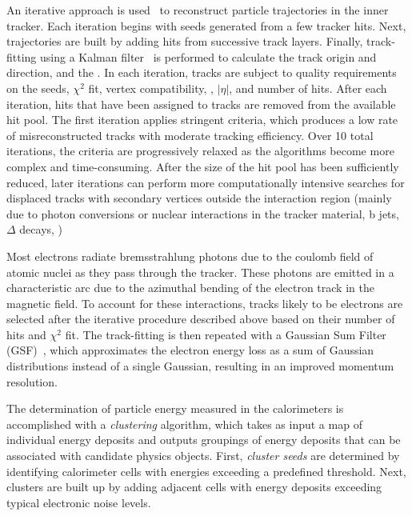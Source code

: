 An iterative approach is used~\cite{Chatrchyan:2014fea} to reconstruct particle
trajectories in the inner tracker. Each iteration begins with seeds generated
from a few tracker hits. Next, trajectories are built by adding hits from
successive track layers. Finally, track-fitting using a Kalman
filter~\cite{Fruhwirth:1987fm} is performed to calculate the track origin and
direction, and the \pT. In each iteration, tracks are subject to quality
requirements on the seeds, $\chi^2$ fit, vertex compatibility, \pT, $|\eta|$,
and number of hits. After each iteration, hits that have been assigned to tracks
are removed from the available hit pool. The first iteration applies stringent
criteria, which produces a low rate of misreconstructed tracks with moderate
tracking efficiency. Over 10 total iterations, the criteria are progressively
relaxed as the algorithms become more complex and time-consuming. After the size
of the hit pool has been sufficiently reduced, later iterations can perform more
computationally intensive searches for displaced tracks with secondary vertices
outside the interaction region (mainly due to photon conversions or nuclear
interactions in the tracker material, b jets, $\Delta$ decays, \etc)

Most electrons radiate bremsstrahlung photons due to the coulomb field of atomic
nuclei as they pass through the tracker. These photons are emitted in a
characteristic arc due to the azimuthal bending of the electron track in the
magnetic field. To account for these interactions, tracks likely to be electrons
are selected after the iterative procedure described above based on their number
of hits and $\chi^2$ fit. The track-fitting is then repeated with a Gaussian Sum
Filter (GSF)~\cite{0954-3899-31-9-N01}, which approximates the electron energy
loss as a sum of Gaussian distributions instead of a single Gaussian, resulting
in an improved momentum resolution.

The determination of particle energy measured in the calorimeters is
accomplished with a \emph{clustering} algorithm, which takes as input a map of
individual energy deposits and outputs groupings of energy deposits that can be
associated with candidate physics objects. First, \emph{cluster seeds} are
determined by identifying calorimeter cells with energies exceeding a predefined
threshold. Next, clusters are built up by adding adjacent cells with energy
deposits exceeding typical electronic noise levels.

